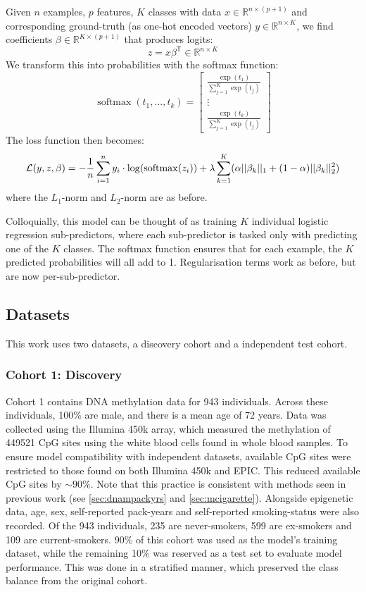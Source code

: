 \documentclass{article}
\DeclareMathOperator*{\softmax}{softmax}
\newcommand{\equationname}[1]{%
    \begingroup
        \leavevmode
        \addcontentsline{equ}{equations}{\protect\numberline{\theequation}#1}%
    \endgroup   
}
\begin{document}
Given \(n\) examples, \(p\) features, \(K\) classes with data \(x \in \mathbb{R}^{n \times (p + 1)}\) and corresponding ground-truth (as one-hot encoded vectors) \(y \in \mathbb{R}^{n \times K}\), we find coefficients \(\beta \in \mathbb{R}^{K \times (p + 1)}\) that produces logits:
\[z = x \beta^\mathsf{T} \in \mathbb{R}^{n \times K}\]
We transform this into probabilities with the softmax function:
\[\softmax(t_1,... , t_k) =
    \begin{bmatrix}
        \frac{\exp(t_1)}{\sum_{j=1}^{K} \exp(t_j)} \\
        \vdots                                     \\
        \frac{\exp(t_k)}{\sum_{j=1}^{K} \exp(t_j)}
    \end{bmatrix}
\]
The loss function then becomes:
\begin{equation} \equationname{Elastic Net logistic regression}
    \mathcal{L}(y, z, \beta) = -\frac{1}{n}\sum_{i=1}^{n} y_i \cdot \log(\softmax(z_i)) + \lambda\sum_{k=1}^{K}(\alpha||\beta_k||_1 + (1 - \alpha)||\beta_k||_2^2)
\end{equation}
where the \(L_1\)-norm and \(L_2\)-norm are as before.

Colloquially, this model can be thought of as training \(K\) individual logistic regression sub-predictors, where each sub-predictor is tasked only with predicting one of the \(K\) classes. The softmax function ensures that for each example, the \(K\) predicted probabilities will all add to 1. Regularisation terms work as before, but are now per-sub-predictor.

\subsection{Datasets}
This work uses two datasets, a discovery cohort and a independent test cohort.

\subsubsection{Cohort 1: Discovery}
Cohort 1 contains DNA methylation data for 943 individuals. Across these individuals, 100\% are male, and there is a mean age of 72 years. Data was collected using the Illumina 450k array, which measured the methylation of \num{449521} CpG sites using the white blood cells found in whole blood samples. To ensure model compatibility with independent datasets, available CpG sites were restricted to those found on both Illumina 450k and EPIC. This reduced available CpG sites by \(\sim\!90\%\). Note that this practice is consistent with methods seen in previous work (see \ref{sec:dnampackyrs} and \ref{sec:mcigarette}). Alongside epigenetic data, age, sex, self-reported pack-years and self-reported smoking-status were also recorded. Of the 943 individuals, 235 are never-smokers, 599 are ex-smokers and 109 are current-smokers. 90\% of this cohort was used as the model's training dataset, while the remaining 10\% was reserved as a test set to evaluate model performance. This was done in a stratified manner, which preserved the class balance from the original cohort.
\end{document}
